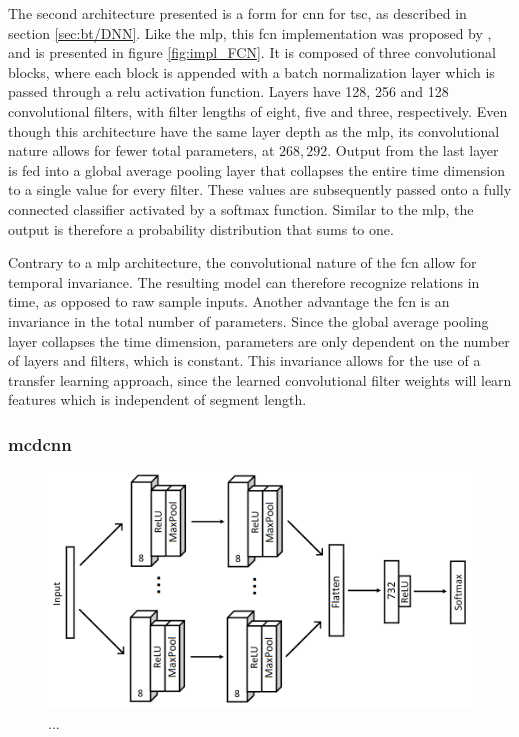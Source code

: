 The second architecture presented is a form for \acrshort{cnn} for \acrshort{tsc}, as described in section \ref{sec:bt/DNN}. Like the \acrshort{mlp}, this \acrfull{fcn} implementation was proposed by \textcite{wang2016}, and is presented in figure \ref{fig:impl_FCN}. It is composed of three convolutional blocks, where each block is appended with a batch normalization layer which is passed through a \acrshort{relu} activation function. Layers have 128, 256 and 128 convolutional filters, with filter lengths of eight, five and three, respectively. Even though this architecture have the same layer depth as the \acrshort{mlp}, its convolutional nature allows for fewer total parameters, at $268,292$. Output from the last layer is fed into a global average pooling layer that collapses the entire time dimension to a single value for every filter. These values are subsequently passed onto a fully connected classifier activated by a softmax function. Similar to the \acrshort{mlp}, the output is therefore a probability distribution that sums to one.


Contrary to a \acrshort{mlp} architecture, the convolutional nature of the \acrshort{fcn} allow for temporal invariance. The resulting model can therefore recognize relations in time, as opposed to raw sample inputs. Another advantage the \acrshort{fcn} is an invariance in the total number of parameters. Since the global average pooling layer collapses the time dimension, parameters are only dependent on the number of layers and filters, which is constant. This invariance allows for the use of a transfer learning approach, since the learned convolutional filter weights will learn features which is independent of segment length.

\newpage
\subsubsection{\acrlong{mcdcnn}}

\begin{figure}[h]
    \centering
    \includegraphics[width=\textwidth]{figures/impl_MCDCNN.png}
    \caption{...}
    \label{fig:impl_MCDCNN}
\end{figure}

